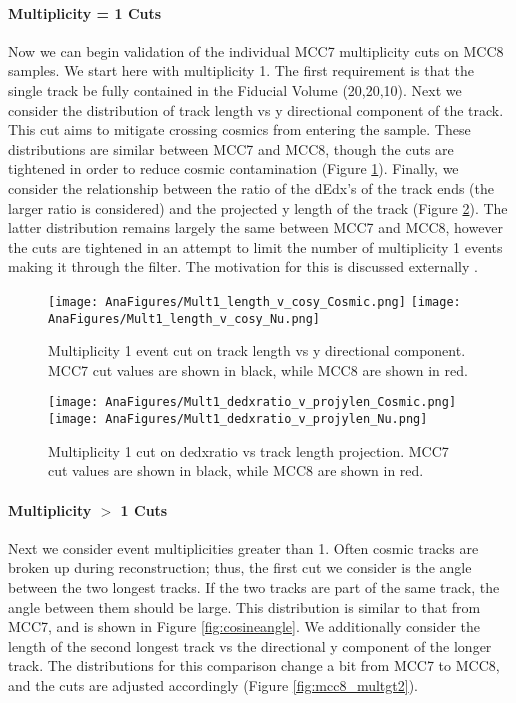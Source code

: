 \documentclass[12pt]{article}
\begin{document}
\paragraph{Multiplicity = 1 Cuts}
Now we can begin validation of the individual MCC7 multiplicity cuts on MCC8 samples. We start here with multiplicity 1. The first requirement is that the single track be fully contained in the Fiducial Volume (20,20,10). Next we consider the distribution of track length vs y directional component of the track.  This cut aims to mitigate crossing cosmics from entering the sample. These distributions are similar between MCC7 and MCC8, though the cuts are tightened in order to reduce cosmic contamination (Figure \ref{fig:mcc8_mult1_00}).  Finally, we consider the relationship between the ratio of the dEdx's of the track ends (the larger ratio is considered) and the projected y length of the track (Figure \ref{fig:mcc8_mult1_0}). The latter distribution remains largely the same between MCC7 and MCC8, however the cuts are tightened in an attempt to limit the number of multiplicity 1 events making it through the filter. The motivation for this is discussed externally \cite{bib:sel2_mcc8}. 

\begin{figure}[h!]
\centering
\texttt{[image: AnaFigures/Mult1\_length\_v\_cosy\_Cosmic.png]}
\hspace{1 mm}
\texttt{[image: AnaFigures/Mult1\_length\_v\_cosy\_Nu.png]}
\caption{Multiplicity 1 event cut on track length vs y directional component.  MCC7 cut values are shown in black, while MCC8 are shown in red. }
\label{fig:mcc8_mult1_00}
\end{figure}

\begin{figure}[h!]
\centering
\texttt{[image: AnaFigures/Mult1\_dedxratio\_v\_projylen\_Cosmic.png]}
\hspace{1 mm}
\texttt{[image: AnaFigures/Mult1\_dedxratio\_v\_projylen\_Nu.png]}
\caption{Multiplicity 1 cut on dedxratio vs track length projection.  MCC7 cut values are shown in black, while MCC8 are shown in red. }
\label{fig:mcc8_mult1_0}
\end{figure}

\paragraph{Multiplicity $>$ 1 Cuts}
Next we consider event multiplicities greater than 1. Often cosmic tracks are broken up during reconstruction; thus, the first cut we consider is the angle between the two longest tracks. If the two tracks are part of the same track, the angle between them should be large. This distribution is similar to that from MCC7, and is shown in Figure \ref{fig:cosineangle}. We additionally consider the length of the second longest track vs the directional y component of the longer track. The distributions for this comparison change a bit from MCC7 to MCC8, and the cuts are adjusted accordingly (Figure \ref{fig:mcc8_multgt2}).
\end{document}
